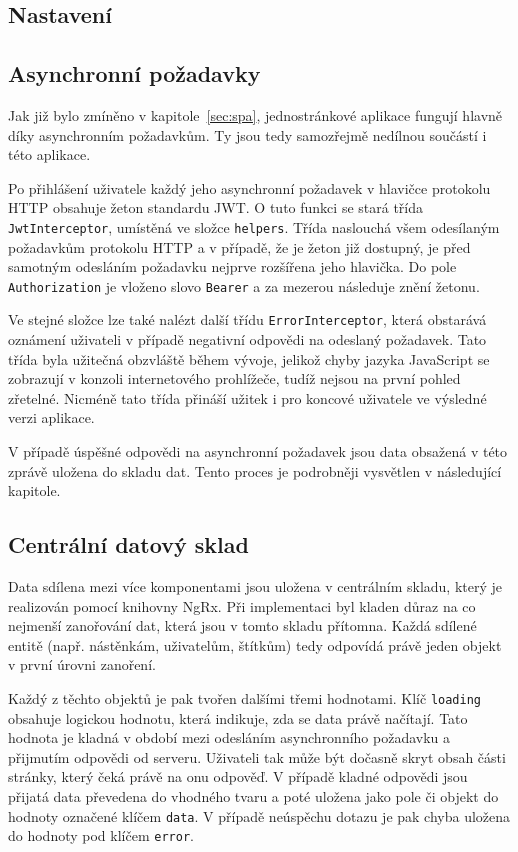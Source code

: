 \subsection{Nastavení}

\subsection{Asynchronní požadavky}
Jak již bylo zmíněno v kapitole~\ref{sec:spa}, jednostránkové aplikace fungují hlavně díky asynchronním požadavkům. Ty jsou tedy samozřejmě nedílnou součástí i této aplikace.

Po přihlášení uživatele každý jeho asynchronní požadavek v hlavičce protokolu HTTP obsahuje žeton standardu JWT. O tuto funkci se stará třída \texttt{JwtInterceptor}, umístěná ve složce \texttt{helpers}. Třída naslouchá všem odesílaným požadavkům protokolu HTTP a v případě, že je žeton již dostupný, je před samotným odesláním požadavku nejprve rozšířena jeho hlavička. Do pole \texttt{Authorization} je vloženo slovo \texttt{Bearer} a za mezerou následuje znění žetonu.

Ve stejné složce lze také nalézt další třídu \texttt{ErrorInterceptor}, která obstarává oznámení uživateli v případě negativní odpovědi na odeslaný požadavek. Tato třída byla užitečná obzvláště během vývoje, jelikož chyby jazyka JavaScript se zobrazují v konzoli internetového prohlížeče, tudíž nejsou na první pohled zřetelné. Nicméně tato třída přináší užitek i pro koncové uživatele ve výsledné verzi aplikace.

V případě úspěšné odpovědi na asynchronní požadavek jsou data obsažená v této zprávě uložena do skladu dat. Tento proces je podrobněji vysvětlen v následující kapitole.

\subsection{Centrální datový sklad}
Data sdílena mezi více komponentami jsou uložena v centrálním skladu, který je realizován pomocí knihovny NgRx. Při implementaci byl kladen důraz na co nejmenší zanořování dat, která jsou v tomto skladu přítomna. Každá sdílené entitě (např. nástěnkám, uživatelům, štítkům) tedy odpovídá právě jeden objekt v první úrovni zanoření.

Každý z těchto objektů je pak tvořen dalšími třemi hodnotami. Klíč \texttt{loading} obsahuje logickou hodnotu, která indikuje, zda se data právě načítají. Tato hodnota je kladná v období mezi odesláním asynchronního požadavku a přijmutím odpovědi od serveru. Uživateli tak může být dočasně skryt obsah části stránky, který čeká právě na onu odpověď. V případě kladné odpovědi jsou přijatá data převedena do vhodného tvaru a poté uložena jako pole či objekt do hodnoty označené klíčem \texttt{data}. V případě neúspěchu dotazu je pak chyba uložena do hodnoty pod klíčem \texttt{error}.

